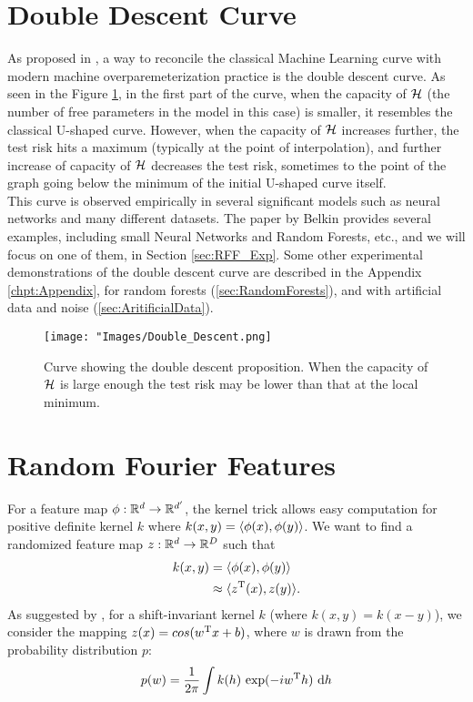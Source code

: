 \documentclass[twoside]{memoir}
\begin{document}
\section{Double Descent Curve}
As proposed in \cite{Belkin_2019}, a way to reconcile the classical Machine Learning curve with modern machine overparemeterization practice is the double descent curve. As seen in the Figure \ref{fig:Double_Descent}, in the first part of the curve, when the capacity of $\mathcal{H}$ (the number of free parameters in the model in this case) is smaller, it resembles the classical U-shaped curve. However, when the capacity of $\mathcal{H}$ increases further, the test risk hits a maximum (typically at the point of interpolation), and further increase of capacity of $\mathcal{H}$ decreases the test risk, sometimes to the point of the graph going below the minimum of the initial U-shaped curve itself. \\
This curve is observed empirically in several significant models such as neural networks and many different datasets. The paper by Belkin  provides several examples, including small Neural Networks and Random Forests, etc., and we will focus on one of them, in Section \ref{sec:RFF_Exp}. Some other experimental demonstrations of the double descent curve are described in the Appendix \ref{chpt:Appendix}, for random forests (\ref{sec:RandomForests}), and with artificial data and noise (\ref{sec:AritificialData}).

\begin{figure}
	\centering
	\texttt{[image: "Images/Double\_Descent.png]}
	\par
	\caption{Curve showing the double descent proposition. When the capacity of $\mathcal{H}$ is large enough the test risk may be lower than that at the local minimum.} \label{fig:Double_Descent}
\end{figure}

\pagebreak

\section{Random Fourier Features} \label{sec:RFFs}
For a feature map $\phi: \mathbb{R}^d \rightarrow \mathbb{R}^{d'}$, the kernel trick allows easy computation for positive definite kernel $k$ where $k(x,y) = \langle\phi(x),\phi(y)\rangle$. We want to find a randomized feature map $z: \mathbb{R}^d \rightarrow \mathbb{R}^D$ such that 
\begin{equation*}
\begin{split}
k(x,y) &= \langle\phi(x), \phi(y)\rangle \\
&\approx \langle z^{\text{T}}(x), z(y)\rangle.
\end{split}
\end{equation*}
As suggested by \cite{RFF_Rahimi}, for a shift-invariant kernel $k$ (where $k(x, y) = k(x - y)$), we consider the mapping $z(x) = cos(w^{\text{T}}x + b)$, where $w$ is drawn from the probability distribution $p$:
\begin{equation}
p(w) = \frac{1}{2\pi} \int k(h) ~ \text{exp}(-iw^{\text{T}}h) ~ \text{d}h
\label{eq:probFourier}
\end{equation} 
\end{document}

